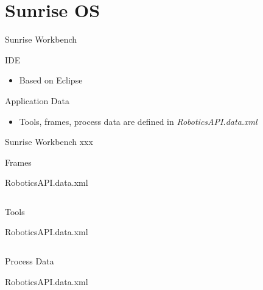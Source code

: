 \documentclass{beamer}
\begin{document}
\section{Sunrise OS}

\begin{frame}{Sunrise Workbench}
  \begin{block}{IDE}
    \begin{itemize}
      \item Based on Eclipse
    \end{itemize}
  \end{block}

  \begin{block}{Application Data}
    \begin{itemize}
      \item Tools, frames, process data are defined in \textit{RoboticsAPI.data.xml}
    \end{itemize}
  \end{block}
\end{frame}

\begin{frame}{Sunrise Workbench}
  xxx
\end{frame}

\begin{frame}[fragile]{Frames}
  \begin{block}{RoboticsAPI.data.xml}
    \inputminted[breaklines,linenos,fontsize=\footnotesize,firstline=5,lastline=10]{xml}{../code/RoboticsAPI.data.xml}
  \end{block}
\end{frame}

\begin{frame}[fragile]{Tools}
  \begin{block}{RoboticsAPI.data.xml}
    \inputminted[breaklines,linenos,fontsize=\tiny,firstline=19,lastline=36]{xml}{../code/RoboticsAPI.data.xml}
  \end{block}
\end{frame}

\begin{frame}[fragile]{Process Data}
  \begin{block}{RoboticsAPI.data.xml}
    \inputminted[breaklines,linenos,fontsize=\footnotesize,firstline=38,lastline=41]{xml}{../code/RoboticsAPI.data.xml}
  \end{block}
\end{frame}
\end{document}

